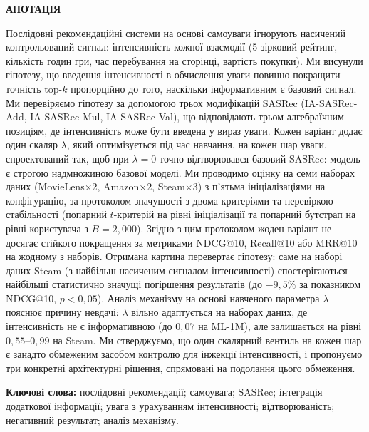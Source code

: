 
\noindent\textbf{АНОТАЦІЯ}

\noindent Послідовні рекомендаційні системи на основі самоуваги ігнорують
насичений контрольований сигнал: інтенсивність кожної взаємодії
(5-зірковий рейтинг, кількість годин гри, час перебування на
сторінці, вартість покупки). Ми висунули гіпотезу, що введення
інтенсивності в обчислення уваги повинно покращити точність top-$k$
пропорційно до того, наскільки інформативним є базовий сигнал. Ми
перевіряємо гіпотезу за допомогою трьох модифікацій SASRec
(IA-SASRec-Add, IA-SASRec-Mul, IA-SASRec-Val), що відповідають
трьом алгебраїчним позиціям, де інтенсивність може бути введена у
вираз уваги. Кожен варіант додає один скаляр $\lambda$, який
оптимізується під час навчання, на кожен шар уваги, спроектований
так, щоб при $\lambda{=}0$ точно відтворювався базовий SASRec:
модель є строгою надмножиною базової моделі. Ми проводимо оцінку на
семи наборах даних (MovieLens$\times$2, Amazon$\times$2,
Steam$\times$3) з п'ятьма ініціалізаціями на конфігурацію, за
протоколом значущості з двома критеріями та перевіркою стабільності
(попарний $t$-критерій на рівні ініціалізації та попарний бутстрап
на рівні користувача з $B{=}2{,}000$). Згідно з цим протоколом
жоден варіант не досягає стійкого покращення за метриками NDCG@10,
Recall@10 або MRR@10 на жодному з наборів. Отримана картина
перевертає гіпотезу: саме на наборі даних Steam (з найбільш
насиченим сигналом інтенсивності) спостерігаються найбільші
статистично значущі погіршення результатів (до $-9{,}5\%$ за
показником NDCG@10, $p<0{,}05$). Аналіз механізму на основі
навченого параметра $\lambda$ пояснює причину невдачі: $\lambda$
вільно адаптується на наборах даних, де інтенсивність не є
інформативною (до $0{,}07$ на ML-1M), але залишається на рівні
$0{,}55$--$0{,}99$ на Steam. Ми стверджуємо, що один скалярний
вентиль на кожен шар є занадто обмеженим засобом контролю для
інжекції інтенсивності, і пропонуємо три конкретні архітектурні
рішення, спрямовані на подолання цього обмеження.

\noindent\textbf{Ключові слова:} послідовні рекомендації;
самоувага; SASRec; інтеграція додаткової інформації; увага з
урахуванням інтенсивності; відтворюваність; негативний результат;
аналіз механізму.

